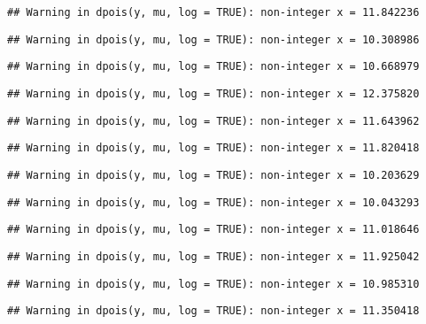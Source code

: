 \documentclass[
]{article}
\begin{document}
\begin{verbatim}
## Warning in dpois(y, mu, log = TRUE): non-integer x = 11.842236
\end{verbatim}

\begin{verbatim}
## Warning in dpois(y, mu, log = TRUE): non-integer x = 10.308986
\end{verbatim}

\begin{verbatim}
## Warning in dpois(y, mu, log = TRUE): non-integer x = 10.668979
\end{verbatim}

\begin{verbatim}
## Warning in dpois(y, mu, log = TRUE): non-integer x = 12.375820
\end{verbatim}

\begin{verbatim}
## Warning in dpois(y, mu, log = TRUE): non-integer x = 11.643962
\end{verbatim}

\begin{verbatim}
## Warning in dpois(y, mu, log = TRUE): non-integer x = 11.820418
\end{verbatim}

\begin{verbatim}
## Warning in dpois(y, mu, log = TRUE): non-integer x = 10.203629
\end{verbatim}

\begin{verbatim}
## Warning in dpois(y, mu, log = TRUE): non-integer x = 10.043293
\end{verbatim}

\begin{verbatim}
## Warning in dpois(y, mu, log = TRUE): non-integer x = 11.018646
\end{verbatim}

\begin{verbatim}
## Warning in dpois(y, mu, log = TRUE): non-integer x = 11.925042
\end{verbatim}

\begin{verbatim}
## Warning in dpois(y, mu, log = TRUE): non-integer x = 10.985310
\end{verbatim}

\begin{verbatim}
## Warning in dpois(y, mu, log = TRUE): non-integer x = 11.350418
\end{verbatim}
\end{document}
